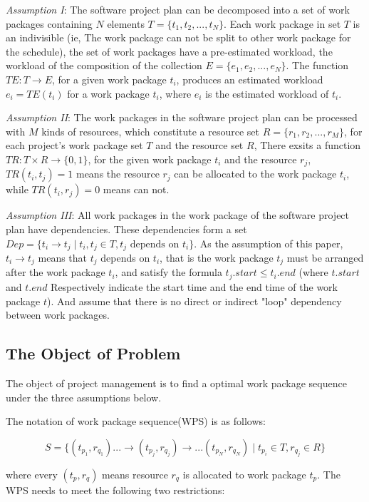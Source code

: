 \emph{Assumption I}: The software project plan can be decomposed into
a set of work packages containing $N$ elements $T = \{t_1, t_2, ...,
t_N \}$.  Each work package in set $T$ is an indivisible (ie, The work
package can not be split to other work package for the schedule), the
set of work packages have a pre-estimated workload, the workload of
the composition of the collection $E = \{e_1, e_2, ..., e_N \}$.  The
function $TE: T \rightarrow E$, for a given work package $t_i$,
produces an estimated workload $e_i = TE(t_i)$ for a work package
$t_i$, where $e_i$ is the estimated workload of $t_i$.


\emph{Assumption II}: The work packages in the software project plan
can be processed with $M$ kinds of resources, which constitute a
resource set $R = \{r_1, r_2, ..., r_M \}$, for each project's work
package set $T$ and the resource set $R$, There exsits a function
$TR: T \times R \rightarrow \{0, 1\}$, for the given work package $t_i$
and the resource $r_j$, $TR(t_i, t_j) = 1$ means the resource $r_j$ can
be allocated to the work package $t_i$, while $TR (t_i, r_j) = 0$ means
can not.


\emph{Assumption III}: All work packages in the work package of the
software project plan have dependencies.  These dependencies form a set
$Dep= \{t_i \rightarrow t_j \mid t_i, t_j \in T, t_j \text{ depends on } t_i\}$.
As the assumption of this paper, $t_i \rightarrow t_j$ means that
$t_j$ depends on $t_i$, that is the work package $t_j$ must be
arranged after the work package $t_i$, and satisfy the formula
$t_j.start \leq t_i.end$ (where $t.start$ and $t.end$ Respectively
indicate the start time and the end time of the work package $t$).
And assume that there is no direct or indirect "loop" dependency
between work packages.


\subsection{The Object of Problem}
%
The object of project management is to find a optimal work package sequence
under the three assumptions below.

The notation of work package sequence(WPS) is as follows:

\begin{equation}
  S = \{
  (t_{p_1}, r_{q_1}) ... \rightarrow (t_{p_j}, r_{q_j}) \rightarrow ... (t_{p_N}, r_{q_N})
  \mid t_{p_i} \in T, r_{q_j} \in R
  \}
\end{equation}

where every $(t_p, r_q)$ means resource $r_q$ is allocated to work package $t_p$.
The WPS needs to meet the following two restrictions:

